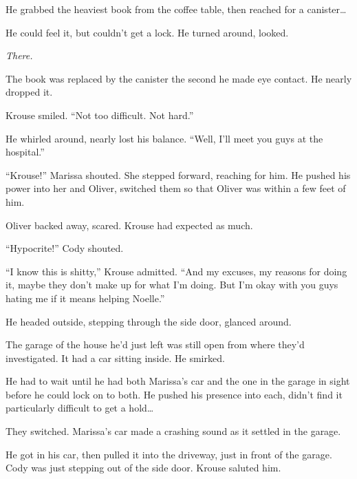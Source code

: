 He grabbed the heaviest book from the coffee table, then reached for a canister\ldots



He could feel it, but couldn't get a lock.  He turned around, looked.



\emph{There.}



The book was replaced by the canister the second he made eye contact.  He nearly dropped it.



Krouse smiled.  ``Not too difficult.  Not hard.''



He whirled around, nearly lost his balance.  ``Well, I'll meet you guys at the hospital.''



``Krouse!''  Marissa shouted.  She stepped forward, reaching for him.  He pushed his power into her and Oliver, switched them so that Oliver was within a few feet of him.



Oliver backed away, scared.  Krouse had expected as much.



``Hypocrite!''  Cody shouted.



``I know this is shitty,'' Krouse admitted.  ``And my excuses, my reasons for doing it, maybe they don't make up for what I'm doing.  But I'm okay with you guys hating me if it means helping Noelle.''



He headed outside, stepping through the side door, glanced around.



The garage of the house he'd just left was still open from where they'd investigated.  It had a car sitting inside.  He smirked.



He had to wait until he had both Marissa's car and the one in the garage in sight before he could lock on to both.  He pushed his presence into each, didn't find it particularly difficult to get a hold\ldots



They switched.  Marissa's car made a crashing sound as it settled in the garage.



He got in his car, then pulled it into the driveway, just in front of the garage.  Cody was just stepping out of the side door.  Krouse saluted him.



